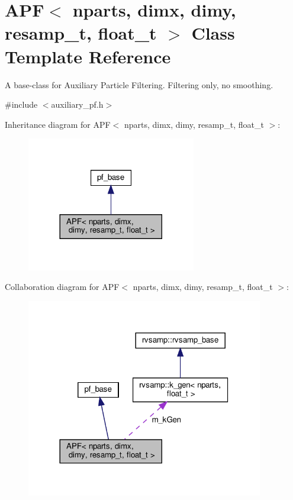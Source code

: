 \hypertarget{classAPF}{}\section{A\+PF$<$ nparts, dimx, dimy, resamp\+\_\+t, float\+\_\+t $>$ Class Template Reference}
\label{classAPF}


A base-\/class for Auxiliary Particle Filtering. Filtering only, no smoothing.  




{\ttfamily \#include $<$auxiliary\+\_\+pf.\+h$>$}



Inheritance diagram for A\+PF$<$ nparts, dimx, dimy, resamp\+\_\+t, float\+\_\+t $>$\+:
\nopagebreak
\begin{figure}[H]
\begin{center}
\leavevmode
\includegraphics[width=209pt]{classAPF__inherit__graph}
\end{center}
\end{figure}


Collaboration diagram for A\+PF$<$ nparts, dimx, dimy, resamp\+\_\+t, float\+\_\+t $>$\+:
\nopagebreak
\begin{figure}[H]
\begin{center}
\leavevmode
\includegraphics[width=293pt]{classAPF__coll__graph}
\end{center}
\end{figure}
